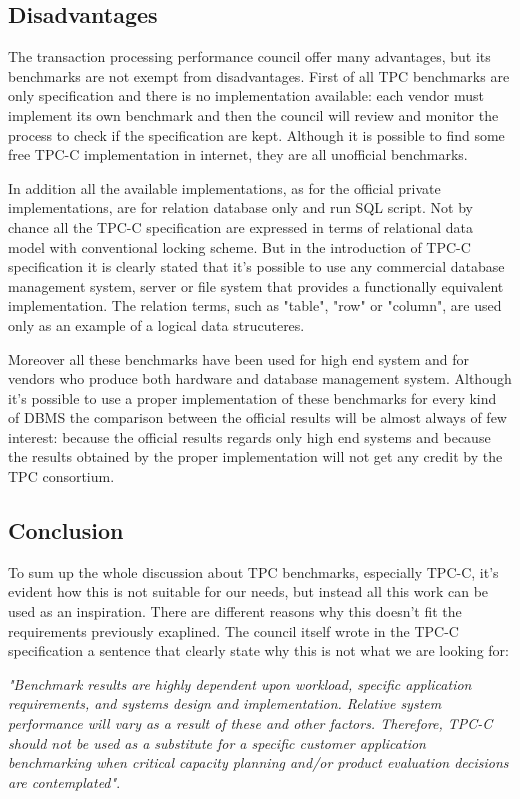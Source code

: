 		\subsection{Disadvantages}
The transaction processing performance council offer many advantages, but its benchmarks are not exempt from disadvantages. First of all TPC benchmarks are only specification and there is no implementation available: each vendor must implement its own benchmark and then the council will review and monitor the process to check if the specification are kept. Although it is possible to find some free TPC-C implementation in internet, they are all unofficial benchmarks.

In addition all the available implementations, as for the official private implementations, are for relation database only and run SQL script. Not by chance all the TPC-C specification are expressed in terms of relational data model with conventional locking scheme. But in the introduction of TPC-C specification \cite{TPC-C} it is clearly stated that it's possible to use any commercial database management system, server or file system that provides a functionally equivalent implementation. The relation terms, such as "table", "row" or "column", are used only as an example of a logical data strucuteres.

Moreover all these benchmarks have been used for high end system and for vendors who produce both hardware and database management system. Although it's possible to use a proper implementation of these benchmarks for every kind of DBMS the comparison between the official results will be almost always of few interest: because the official results regards only high end systems and because the results obtained by the proper implementation will not get any credit by the TPC consortium.

		\subsection{Conclusion}
To sum up the whole discussion about TPC benchmarks, especially TPC-C, it's evident how this is not suitable for our needs, but instead all this work can be used as an inspiration. There are different reasons why this doesn't fit the requirements previously exaplined. The council itself wrote in the TPC-C specification \cite{TPC-C} a sentence that clearly state why this is not what we are looking for:

\emph{"Benchmark results are highly dependent upon workload, specific application requirements, and systems design and implementation. Relative system performance will vary as a result of these and other factors. Therefore, TPC-C should not be used as a substitute for a specific customer application benchmarking when critical capacity planning and/or product evaluation decisions are contemplated"}.


